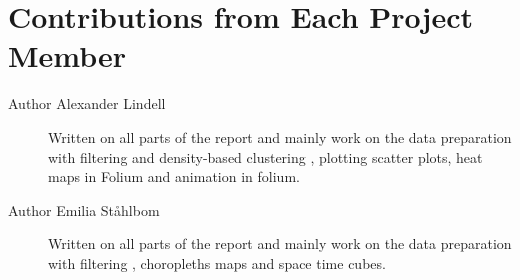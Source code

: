 \documentclass[journal]{vgtc}                %
\begin{document}


\section*{Contributions from Each Project Member}\label{cont}

\begin{description}
\item[Author Alexander Lindell] {
Written on all parts of the report and mainly work on the data preparation with filtering and density-based clustering , plotting scatter plots, heat maps in Folium and animation in folium.}
\item[Author Emilia Ståhlbom] {
Written on all parts of the report and mainly work on the data preparation with filtering , choropleths maps and space time cubes.}


\end{description}
\end{document}
